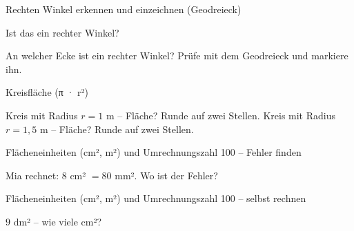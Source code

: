 \begin{aufgabe}{Rechten Winkel erkennen und einzeichnen (Geodreieck)}
\begin{teile}
\teil Ist das ein rechter Winkel? \janein

\teil An welcher Ecke ist ein rechter Winkel? Prüfe mit dem Geodreieck und markiere ihn.

\end{teile}
\end{aufgabe}

\begin{aufgabe}{Kreisfläche (π · r²)}
\begin{teile}
\teil Kreis mit Radius $r = 1$ m – Fläche? Runde auf zwei Stellen. \leerfeld[m²]
\teil Kreis mit Radius $r = 1{,}5$ m – Fläche? Runde auf zwei Stellen. \leerfeld[m²]
\end{teile}
\end{aufgabe}

\begin{aufgabe}{Flächeneinheiten (cm², m²) und Umrechnungszahl 100 – Fehler finden}
\begin{teile}
\teil Mia rechnet: $8$ cm² $= 80$ mm². Wo ist der Fehler?
\end{teile}
\end{aufgabe}

\begin{aufgabe}{Flächeneinheiten (cm², m²) und Umrechnungszahl 100 – selbst rechnen}
\begin{teile}
\teil $9$ dm² – wie viele cm²? \leerfeld[cm²]
\end{teile}
\end{aufgabe}
